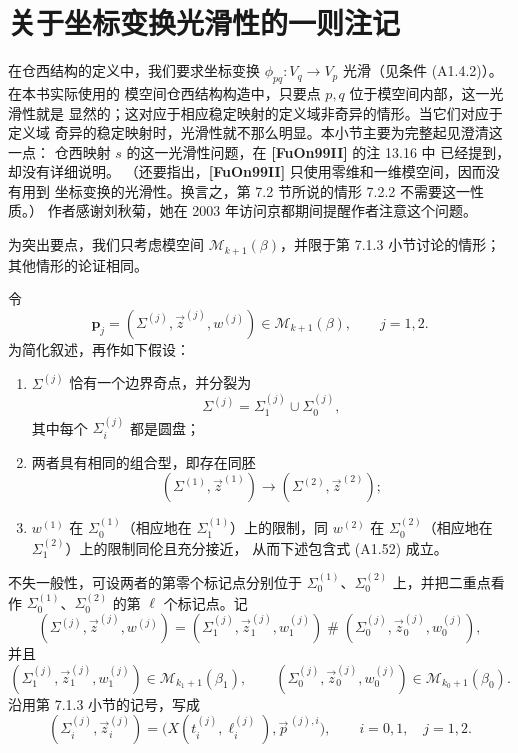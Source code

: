
\section{关于坐标变换光滑性的一则注记}
\label{sec:a1-4}

在仓西结构的定义中，我们要求坐标变换
$\phi_{pq}\colon V_q\to V_p$ 光滑（见条件 (A1.4.2)）。在本书实际使用的
模空间仓西结构构造中，只要点 $p,q$ 位于模空间内部，这一光滑性就是
显然的；这对应于相应稳定映射的定义域非奇异的情形。当它们对应于定义域
奇异的稳定映射时，光滑性就不那么明显。本小节主要为完整起见澄清这一点：
仓西映射 $s$ 的这一光滑性问题，在 \textbf{[FuOn99II]} 的注 13.16 中
已经提到，却没有详细说明。
（还要指出，\textbf{[FuOn99II]} 只使用零维和一维模空间，因而没有用到
坐标变换的光滑性。换言之，第 7.2 节所说的情形 7.2.2 不需要这一性质。）
作者感谢刘秋菊，她在 2003 年访问京都期间提醒作者注意这个问题。

为突出要点，我们只考虑模空间 $\mathcal M_{k+1}(\beta)$，并限于第
7.1.3 小节讨论的情形；其他情形的论证相同。

令
\[
 \mathbf p_j=(\Sigma^{(j)},\vec z^{(j)},w^{(j)})
 \in\mathcal M_{k+1}(\beta),\qquad j=1,2.
\]
为简化叙述，再作如下假设：
\begin{enumerate}[label=\textup{(\arabic*)},leftmargin=3em]
\item $\Sigma^{(j)}$ 恰有一个边界奇点，并分裂为
\[
 \Sigma^{(j)}=\Sigma_1^{(j)}\cup\Sigma_0^{(j)},
\]
其中每个 $\Sigma_i^{(j)}$ 都是圆盘；
\item 两者具有相同的组合型，即存在同胚
\[
 (\Sigma^{(1)},\vec z^{(1)})
 \longrightarrow(\Sigma^{(2)},\vec z^{(2)});
\]
\item $w^{(1)}$ 在 $\Sigma_0^{(1)}$（相应地在
$\Sigma_1^{(1)}$）上的限制，同 $w^{(2)}$ 在
$\Sigma_0^{(2)}$（相应地在 $\Sigma_1^{(2)}$）上的限制同伦且充分接近，
从而下述包含式 (A1.52) 成立。
\end{enumerate}
不失一般性，可设两者的第零个标记点分别位于
$\Sigma_0^{(1)}$、$\Sigma_0^{(2)}$ 上，并把二重点看作
$\Sigma_0^{(1)}$、$\Sigma_0^{(2)}$ 的第 $\ell$ 个标记点。记
\[
 (\Sigma^{(j)},\vec z^{(j)},w^{(j)})
 =
 (\Sigma_1^{(j)},\vec z_1^{(j)},w_1^{(j)})
 \mathbin{\#}
 (\Sigma_0^{(j)},\vec z_0^{(j)},w_0^{(j)}),
\]
并且
\[
 (\Sigma_1^{(j)},\vec z_1^{(j)},w_1^{(j)})
 \in\mathcal M_{k_1+1}(\beta_1),\qquad
 (\Sigma_0^{(j)},\vec z_0^{(j)},w_0^{(j)})
 \in\mathcal M_{k_0+1}(\beta_0).
\]
沿用第 7.1.3 小节的记号，写成
\[
 (\Sigma_i^{(j)},\vec z_i^{(j)})
 =\bigl(X(t_i^{(j)},\ell_i^{(j)}),\vec p^{\,(j),i}\bigr),
 \qquad i=0,1,\quad j=1,2.
\]

